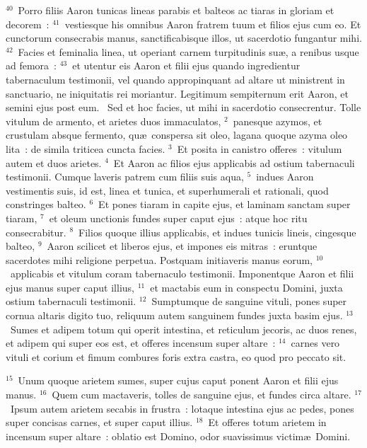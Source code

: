 ${}^{40}$~Porro filiis Aaron tunicas lineas parabis et balteos ac tiaras in gloriam et decorem~:
${}^{41}$~vestiesque his omnibus Aaron fratrem tuum et filios ejus cum eo. Et cunctorum consecrabis manus, sanctificabisque illos, ut sacerdotio fungantur mihi.
${}^{42}$~Facies et feminalia linea, ut operiant carnem turpitudinis su\ae , a renibus usque ad femora~:
${}^{43}$~et utentur eis Aaron et filii ejus quando ingredientur tabernaculum testimonii, vel quando appropinquant ad altare ut ministrent in sanctuario, ne iniquitatis rei moriantur. Legitimum sempiternum erit Aaron, et semini ejus post eum.
~Sed et hoc facies, ut mihi in sacerdotio consecrentur. Tolle vitulum de armento, et arietes duos immaculatos,
${}^{2}$~panesque azymos, et crustulam absque fermento, qu\ae\ conspersa sit oleo, lagana quoque azyma oleo lita~: de simila triticea cuncta facies.
${}^{3}$~Et posita in canistro offeres~: vitulum autem et duos arietes.
${}^{4}$~Et Aaron ac filios ejus applicabis ad ostium tabernaculi testimonii. Cumque laveris patrem cum filiis suis aqua,
${}^{5}$~indues Aaron vestimentis suis, id est, linea et tunica, et superhumerali et rationali, quod constringes balteo.
${}^{6}$~Et pones tiaram in capite ejus, et laminam sanctam super tiaram,
${}^{7}$~et oleum unctionis fundes super caput ejus~: atque hoc ritu consecrabitur.
${}^{8}$~Filios quoque illius applicabis, et indues tunicis lineis, cingesque balteo,
${}^{9}$~Aaron scilicet et liberos ejus, et impones eis mitras~: eruntque sacerdotes mihi religione perpetua. Postquam initiaveris manus eorum,
${}^{10}$~applicabis et vitulum coram tabernaculo testimonii. Imponentque Aaron et filii ejus manus super caput illius,
${}^{11}$~et mactabis eum in conspectu Domini, juxta ostium tabernaculi testimonii.
${}^{12}$~Sumptumque de sanguine vituli, pones super cornua altaris digito tuo, reliquum autem sanguinem fundes juxta basim ejus.
${}^{13}$~Sumes et adipem totum qui operit intestina, et reticulum jecoris, ac duos renes, et adipem qui super eos est, et offeres incensum super altare~:
${}^{14}$~carnes vero vituli et corium et fimum combures foris extra castra, eo quod pro peccato sit.


${}^{15}$~Unum quoque arietem sumes, super cujus caput ponent Aaron et filii ejus manus.
${}^{16}$~Quem cum mactaveris, tolles de sanguine ejus, et fundes circa altare.
${}^{17}$~Ipsum autem arietem secabis in frustra~: lotaque intestina ejus ac pedes, pones super concisas carnes, et super caput illius.
${}^{18}$~Et offeres totum arietem in incensum super altare~: oblatio est Domino, odor suavissimus victim\ae\ Domini.


